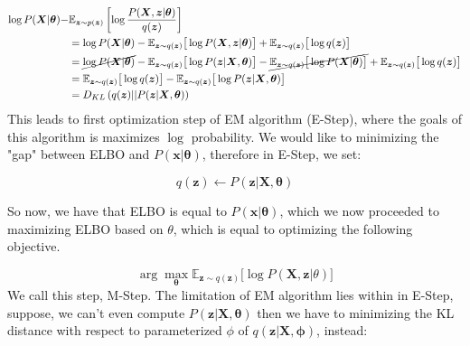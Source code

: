 \begin{equation}
    \begin{aligned}
        \log P(\boldsymbol{X} |\boldsymbol{\theta}) - &\mathbb{E}_{\boldsymbol{z} \sim p(\boldsymbol{z})} \left[ \log\frac{P(\boldsymbol{X}, \boldsymbol{z} | \boldsymbol{\theta})}{q(\boldsymbol{z})} \right] \\
        &= \log P(\boldsymbol{X} |\boldsymbol{\theta}) - \mathbb{E}_{\boldsymbol{z} \sim q(\boldsymbol{z})}\big[ \log P(\boldsymbol{X}, \boldsymbol{z} | \boldsymbol{\theta}) \big] + \mathbb{E}_{\boldsymbol{z} \sim q(\boldsymbol{z})} \big[ \log q(\boldsymbol{z}) \big]  \\ 
        &= \cancel{\log P(\boldsymbol{X} |\boldsymbol{\theta})} - \mathbb{E}_{\boldsymbol{z} \sim q(\boldsymbol{z})}\big[ \log P( \boldsymbol{z} |\boldsymbol{X} , \boldsymbol{\theta}) \big] - \cancel{\mathbb{E}_{\boldsymbol{z} \sim q(\boldsymbol{z})}\big[ \log P( \boldsymbol{X} | \boldsymbol{\theta}) \big]} + \mathbb{E}_{\boldsymbol{z} \sim q(\boldsymbol{z})} \big[ \log q(\boldsymbol{z}) \big] \\ 
        &=  \mathbb{E}_{\boldsymbol{z} \sim q(\boldsymbol{z})} \big[ \log q(\boldsymbol{z}) \big] - \mathbb{E}_{\boldsymbol{z} \sim q(\boldsymbol{z})} \big[ \log P( \boldsymbol{z} |\boldsymbol{X} , \boldsymbol{\theta}) \big] \\
        &= D_{KL} \left( q(\boldsymbol{z}) || P( \boldsymbol{z} |\boldsymbol{X} , \boldsymbol{\theta}) \right)
    \end{aligned}
\end{equation}
This leads to first optimization step of EM algorithm (E-Step), where the goals of this algorithm is maximizes $\log$ probability. We would like to minimizing the "gap" between ELBO and $P(\boldsymbol{x} | \boldsymbol{\theta})$, therefore in E-Step, we set: 

$$
q(\boldsymbol{z}) \leftarrow P( \boldsymbol{z} |\boldsymbol{X} , \boldsymbol{\theta})
$$

So now, we have that ELBO is equal to $P(\boldsymbol{x} | \boldsymbol{\theta})$, which we now proceeded to maximizing ELBO based on $\theta$, which is equal to optimizing the following objective. 

\begin{equation}
    \arg\max_{\boldsymbol{\theta}} \mathbb{E}_{\boldsymbol{z} \sim q(\boldsymbol{z})}\big[\log P(\boldsymbol{X}, \boldsymbol{z} | \theta)\big]
\end{equation}
We call this step, M-Step. The limitation of EM algorithm lies within in E-Step, suppose, we can't even compute $P( \boldsymbol{z} |\boldsymbol{X} , \boldsymbol{\theta})$ then we have to minimizing the KL distance with respect to parameterized $\phi$ of $q(\boldsymbol{z} | \boldsymbol{X}, \boldsymbol{\phi})$, instead: 


